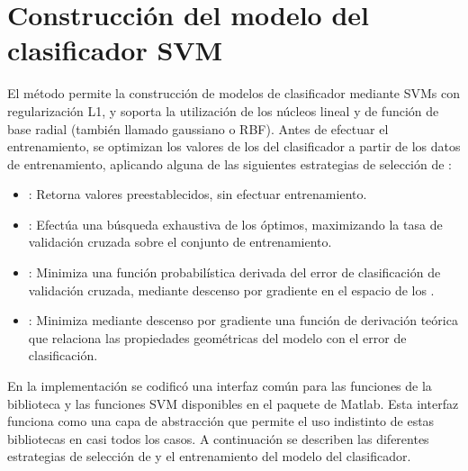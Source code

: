 %
%
\section{Construcción del modelo del clasificador SVM}
%
El método permite la construcción de modelos de clasificador mediante
SVMs con regularización L1, y soporta la utilización de los núcleos
lineal y de función de base radial (también llamado gaussiano o RBF).
Antes de efectuar el entrenamiento, se optimizan los valores de los
 del clasificador a partir de los datos de entrenamiento,
aplicando alguna de las siguientes estrategias de selección de
:
%
\begin{itemize}
\item
  : Retorna valores preestablecidos,
  sin efectuar entrenamiento.
\item
  : Efectúa una búsqueda exhaustiva de los
   óptimos, maximizando la tasa \GM{} de validación cruzada
  sobre el conjunto de entrenamiento.
\item
  : Minimiza una función probabilística
  derivada del error de clasificación de validación cruzada, mediante
  descenso por gradiente en el espacio de los .
\item
  : Minimiza mediante descenso
  por gradiente una función de derivación teórica que relaciona
  las propiedades geométricas del modelo con el error de clasificación.
\end{itemize}
%

En la implementación se codificó una interfaz común para las funciones
de la biblioteca  \cite{libsvm} y las funciones SVM
disponibles en el paquete  de Matlab.
Esta interfaz funciona como una capa de abstracción que permite el uso
indistinto de estas bibliotecas en casi todos los casos.
A continuación se describen las diferentes estrategias de selección de
 y el entrenamiento del modelo del clasificador.
